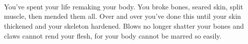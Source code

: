 \documentclass[darkmode]{dw_playbook}
\begin{document}
\begin{minipage}[t]{0.90\textwidth}
\begin{minipage}[t]{0.3\textwidth}
        \vspace{1mm}
        \race\\
    \end{minipage}
    \begin{minipage}[t]{4mm}
        ~
    \end{minipage}
    \begin{minipage}[t]{0.65\textwidth}
        \startingMoves\\[2mm]
        \begin{multicols*}{2}
                {You’ve spent your life remaking your body.  You broke bones, seared skin, split muscle, then mended them all.  Over and over you’ve done this until your skin thickened and your skeleton hardened.  Blows no longer shatter your bones and claws cannot rend your flesh, for your body cannot be marred so easily.

}
\end{multicols*}
\end{minipage}
\end{minipage}
\end{document}
